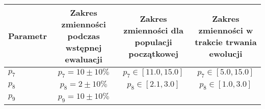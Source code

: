 \documentclass[]{article}
\begin{document}
\begin{longtable}[c]{@{}lccc@{}}
\toprule
\begin{minipage}[b]{0.13\columnwidth}\raggedright\strut
Parametr
\strut\end{minipage} &
\begin{minipage}[b]{0.26\columnwidth}\centering\strut
Zakres zmienności podczas wstępnej ewaluacji
\strut\end{minipage} &
\begin{minipage}[b]{0.24\columnwidth}\centering\strut
Zakres zmienności dla populacji początkowej
\strut\end{minipage} &
\begin{minipage}[b]{0.26\columnwidth}\centering\strut
Zakres zmienności w trakcie trwania ewolucji
\strut\end{minipage}\tabularnewline
\midrule
\endhead
\begin{minipage}[t]{0.13\columnwidth}\raggedright\strut
\(p_7\)
\strut\end{minipage} &
\begin{minipage}[t]{0.26\columnwidth}\centering\strut
\(p_7 = 10 \pm 10\%\)
\strut\end{minipage} &
\begin{minipage}[t]{0.24\columnwidth}\centering\strut
\(p_7 \in [11.0,15.0]\)
\strut\end{minipage} &
\begin{minipage}[t]{0.26\columnwidth}\centering\strut
\(p_7 \in [5.0,15.0]\)
\strut\end{minipage}\tabularnewline
\begin{minipage}[t]{0.13\columnwidth}\raggedright\strut
\(p_8\)
\strut\end{minipage} &
\begin{minipage}[t]{0.26\columnwidth}\centering\strut
\(p_8 = 2 \pm 10 \%\)
\strut\end{minipage} &
\begin{minipage}[t]{0.24\columnwidth}\centering\strut
\(p_{8} \in [2.1,3.0]\)
\strut\end{minipage} &
\begin{minipage}[t]{0.26\columnwidth}\centering\strut
\(p_8 \in [1.0,3.0]\)
\strut\end{minipage}\tabularnewline
\begin{minipage}[t]{0.13\columnwidth}\raggedright\strut
\(p_9\)
\strut\end{minipage} &
\begin{minipage}[t]{0.26\columnwidth}\centering\strut
\(p_9 = 10 \pm 10 \%\)

\end{minipage}
\end{longtable}
\end{document}

